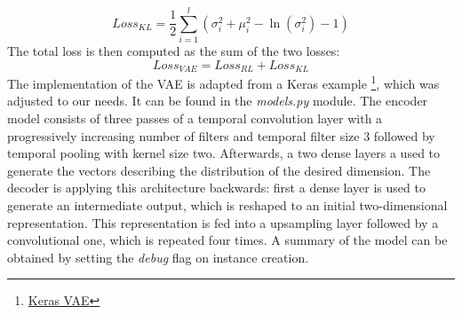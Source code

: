 \documentclass[journal]{Imperial_lab_report}
\begin{document}
\begin{equation}
    Loss_{KL} = \frac{1}{2} \sum_{i=1}^l (\sigma_i^2 + \mu_i^2 - \ln(\sigma_i^2) - 1)
\end{equation}
The total loss is then computed as the sum of the two losses:
\begin{equation}
    Loss_{VAE} = Loss_{RL} + Loss_{KL}
\end{equation}
The implementation of the VAE is adapted from a Keras example \footnote{\href{https://keras.io/examples/variational_autoencoder/}{Keras VAE}}, which was adjusted to our needs. It can be found in the \emph{models.py} module. The encoder model consists of three passes of a temporal convolution layer with a progressively increasing number of filters and temporal filter size 3 followed by temporal pooling with kernel size two. Afterwards, a two dense layers a used to generate the vectors describing the distribution of the desired dimension. The decoder is applying this architecture backwards: first a dense layer is used to generate an intermediate output, which is reshaped to an initial two-dimensional representation. This representation is fed into a upsampling layer followed by a convolutional one, which is repeated four times. A summary of the model can be obtained by setting the \emph{debug} flag on instance creation.
\end{document}
